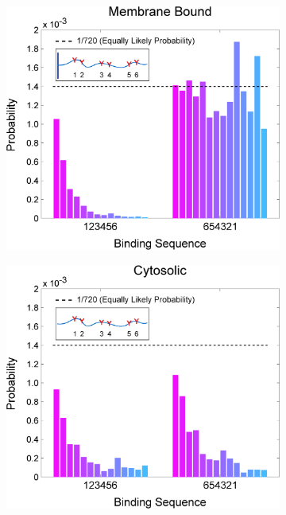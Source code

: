 \documentclass[../../AdvancementSummary.tex]{subfiles}
\begin{document}
\begin{figure}
	\begin{center}
		\begin{subfigure}{0.3\linewidth}
			\includegraphics[width=\linewidth]{ResultsFigures/MultipleSequentialBinding/MemOn/ProbVSSequence.eps}
			\caption{}
		\end{subfigure}
		\begin{subfigure}{0.3\linewidth}
			\includegraphics[width=\linewidth]{ResultsFigures/MultipleSequentialBinding/MemOff/ProbVSSequence.eps}

\end{subfigure}
\end{center}
\end{figure}
\end{document}
